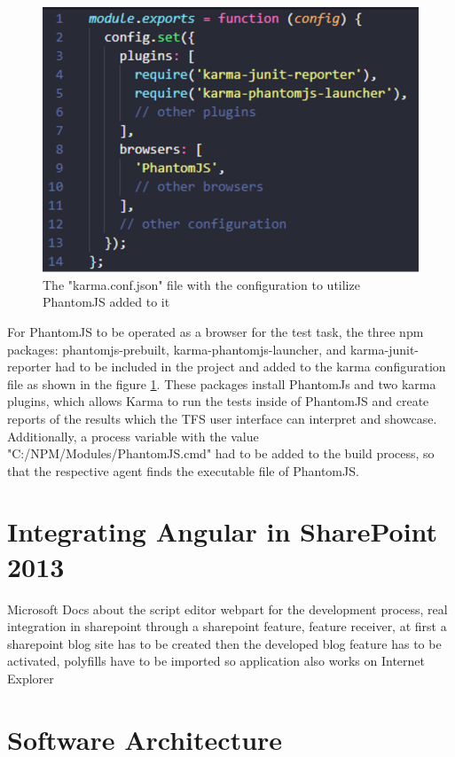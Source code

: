 \documentclass[Bachelor,BIF,english]{twbook}
\begin{document}
\\[\baselineskip]
\begin{figure}[!htbp]
\centering
\includegraphics[width=0.5\linewidth]{PICs/karma_phantomjs.eps}
\caption{The "karma.conf.json" file with the configuration to utilize PhantomJS added to it}\label{Fig3}
\end{figure}
For PhantomJS to be operated as a browser for the test task, the three npm packages: phantomjs-prebuilt, karma-phantomjs-launcher, and karma-junit-reporter had to be included in the project and added to the karma configuration file as shown in the figure \ref{Fig3}. These packages install PhantomJs and two karma plugins, which allows Karma to run the tests inside of PhantomJS and create reports of the results which the TFS user interface can interpret and showcase. Additionally, a process variable with the value "C:/NPM/Modules/PhantomJS.cmd" had to be added to the build process, so that the respective agent finds the executable file of PhantomJS.

\section{Integrating Angular in SharePoint 2013}
Microsoft Docs about the script editor webpart for the development process, real integration in sharepoint through a sharepoint feature, feature receiver, at first a sharepoint blog site has to be created then the developed blog feature has to be activated, polyfills have to be imported so application also works on Internet Explorer

\section{Software Architecture}
\end{document}
